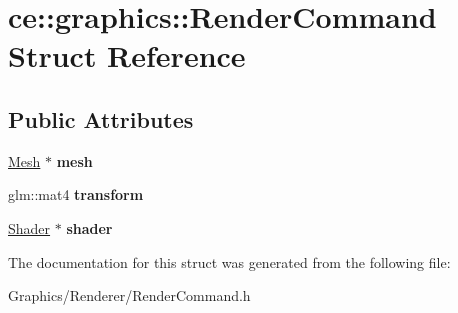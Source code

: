 \hypertarget{structce_1_1graphics_1_1_render_command}{}\section{ce\+:\+:graphics\+:\+:Render\+Command Struct Reference}
\label{structce_1_1graphics_1_1_render_command}
\subsection*{Public Attributes}
\begin{DoxyCompactItemize}
\item 
\mbox{\label{structce_1_1graphics_1_1_render_command_aea0982beaba0aecd4bc10f0e9f84d741}} 
\hyperlink{classce_1_1graphics_1_1_mesh}{Mesh} $\ast$ {\bfseries mesh}
\item 
\mbox{\label{structce_1_1graphics_1_1_render_command_a917fc9ebe6d75b747bac29e70a7fad3c}} 
glm\+::mat4 {\bfseries transform}
\item 
\mbox{\label{structce_1_1graphics_1_1_render_command_a90d36894ca0b20aa92de41b2887f421f}} 
\hyperlink{classce_1_1graphics_1_1_shader}{Shader} $\ast$ {\bfseries shader}
\end{DoxyCompactItemize}


The documentation for this struct was generated from the following file\+:\begin{DoxyCompactItemize}
\item 
Graphics/\+Renderer/Render\+Command.\+h\end{DoxyCompactItemize}
